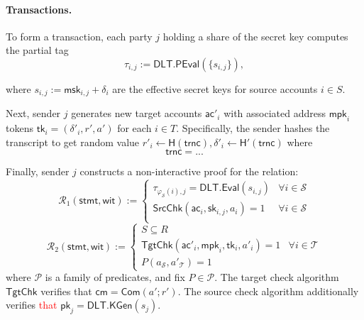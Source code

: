 \paragraph{Transactions.}
To form a transaction, each party $j$ holding a share of the secret key computes the partial tag
    \[
        \tau_{i,j} := \mathsf{DLT.PEval}(\{s_{i,j}\}),
    \]
   
where $s_{i,j} := \mathsf{msk}_{i,j} + \delta_i$ are the effective secret keys for source accounts $i \in S$. 

Next, sender $j$ generates new target accounts $\mathsf{ac}'_i$ with associated address $\mathsf{mpk}_i$ tokens $\mathsf{tk}_i= (\delta'_i, r', a')$ for each $i \in T$. Specifically, the sender hashes the transcript to get random value $r'_i \leftarrow \mathsf{H(trnc)},\delta'_i \leftarrow \mathsf{H'(trnc)}$ where
\[
\mathsf{trnc}=...
\]


Finally, sender $j$ constructs a non-interactive proof for the relation:
\[
\mathcal{R}_1(\mathsf{stmt}, \mathsf{wit}) := 
\begin{cases}
\tau_{\varphi_{\mathcal{S}}(i),j} = \mathsf{DLT.Eval}(s_{i,j}) & \forall i \in \mathcal{S} \\[4pt]
\mathsf{SrcChk}(\mathsf{ac}_i, \mathsf{sk}_{i,j}, a_i) = 1 & \forall i \in \mathcal{S} \\[4pt]
\end{cases}
\]
\[
\mathcal{R}_2(\mathsf{stmt}, \mathsf{wit}) := 
\begin{cases}
S \subseteq R \\[4pt]
\mathsf{TgtChk}(\mathsf{ac}'_i, \mathsf{mpk}_i, \mathsf{tk}_i, a'_i) = 1 & \forall i \in \mathcal{T} \\[4pt]
P(a_{\mathcal{S}}, a'_{\mathcal{T}}) = 1
\end{cases}
\]
where $\mathcal{P}$ is a family of predicates, and fix $P \in \mathcal{P}$. The target check algorithm $\mathsf{TgtChk}$ verifies that $\mathsf{cm} = \mathsf{Com}(a'; r')$. The {source check algorithm} additionally verifies \textcolor{red}{that} $\mathsf{pk}_j = \mathsf{DLT.KGen}(s_j)$.





